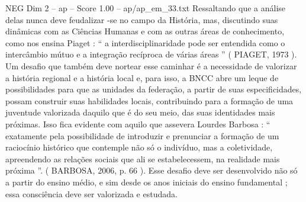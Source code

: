 \begin{textsample}{NEG Dim 2 – ap – Score 1.00 – ap/ap\_em\_33.txt}
Ressaltando que a análise delas nunca deve feudalizar -se no campo da História, mas, discutindo suas dinâmicas com as Ciências Humanas e com as outras áreas de conhecimento, como nos ensina Piaget : “ a interdisciplinaridade pode ser entendida como o intercâmbio mútuo e a integração recíproca de várias áreas ” ( PIAGET, 1973 ).
Um desafio que também deve nortear esse caminhar é a necessidade de valorizar a história regional e a história local e, para isso, a BNCC abre um leque de possibilidades para que as unidades da federação, a partir de suas especificidades, possam construir suas habilidades locais, contribuindo para a formação de uma juventude valorizada daquilo que é do seu meio, das suas identidades mais próximas.
Isso fica evidente com aquilo que assevera Lourdes Barbosa : “ exatamente pela possibilidade de introduzir e prenunciar a formação de um raciocínio histórico que contemple não só o indivíduo, mas a coletividade, apreendendo as relações sociais que ali se estabelecessem, na realidade mais próxima ”. ( BARBOSA, 2006, p. 66 ).
Esse desafio deve ser desenvolvido não só a partir do ensino médio, e sim desde os anos iniciais do ensino fundamental ; essa consciência deve ser valorizada e estudada.

\end{textsample}
